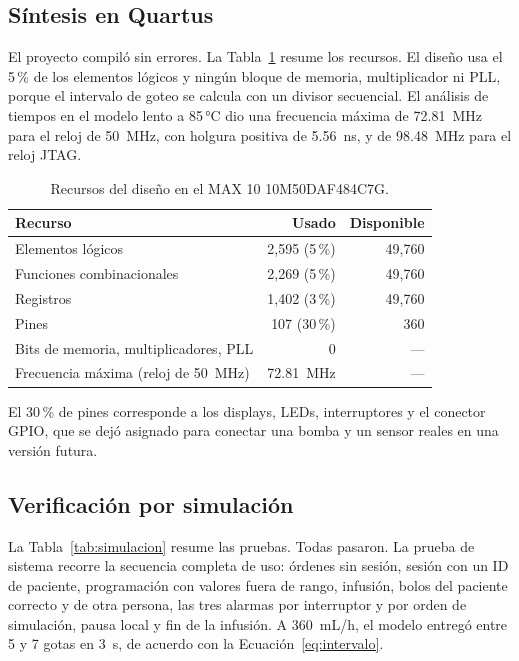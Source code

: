 \documentclass[11pt,letterpaper]{article}
\begin{document}
\subsection{Síntesis en Quartus}
El proyecto compiló sin errores. La Tabla~\ref{tab:recursos} resume los recursos. El diseño usa el 5\,\% de los elementos lógicos y ningún bloque de memoria, multiplicador ni PLL, porque el intervalo de goteo se calcula con un divisor secuencial. El análisis de tiempos en el modelo lento a 85\,°C dio una frecuencia máxima de 72.81~MHz para el reloj de 50~MHz, con holgura positiva de 5.56~ns, y de 98.48~MHz para el reloj JTAG.

\begin{table}[H]
\centering
\caption{Recursos del diseño en el MAX 10 10M50DAF484C7G.}
\label{tab:recursos}
\begin{tabular}{lrr}
\toprule
\textbf{Recurso} & \textbf{Usado} & \textbf{Disponible} \\
\midrule
Elementos lógicos & 2,595 (5\,\%) & 49,760 \\
Funciones combinacionales & 2,269 (5\,\%) & 49,760 \\
Registros & 1,402 (3\,\%) & 49,760 \\
Pines & 107 (30\,\%) & 360 \\
Bits de memoria, multiplicadores, PLL & 0 & --- \\
Frecuencia máxima (reloj de 50~MHz) & 72.81~MHz & --- \\
\bottomrule
\end{tabular}
\end{table}

El 30\,\% de pines corresponde a los displays, LEDs, interruptores y el conector GPIO, que se dejó asignado para conectar una bomba y un sensor reales en una versión futura.

\subsection{Verificación por simulación}
La Tabla~\ref{tab:simulacion} resume las pruebas. Todas pasaron. La prueba de sistema recorre la secuencia completa de uso: órdenes sin sesión, sesión con un ID de paciente, programación con valores fuera de rango, infusión, bolos del paciente correcto y de otra persona, las tres alarmas por interruptor y por orden de simulación, pausa local y fin de la infusión. A 360~mL/h, el modelo entregó entre 5 y 7 gotas en 3~s, de acuerdo con la Ecuación~\eqref{eq:intervalo}.
\end{document}
